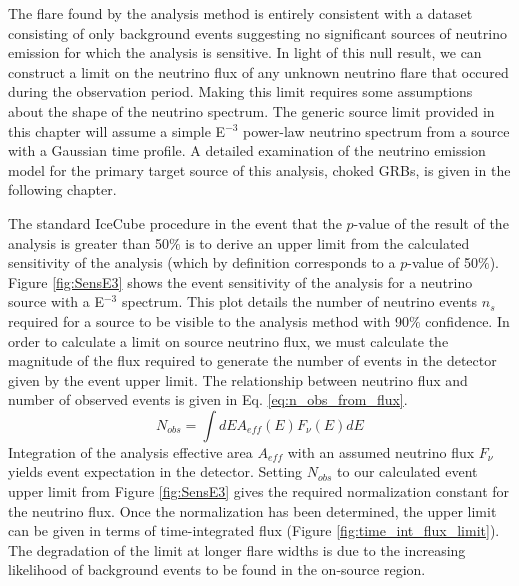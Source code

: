 \documentclass{gatech-thesis}
\begin{document}
The flare found by the analysis method is entirely consistent with a dataset consisting of only background events suggesting no significant sources of neutrino emission for which the analysis is sensitive. In light of this null result, we can construct a limit on the neutrino flux of any unknown neutrino flare that occured during the observation period. Making this limit requires some assumptions about the shape of the neutrino spectrum. The generic source limit provided in this chapter will assume a simple E$^{-3}$ power-law neutrino spectrum from a source with a Gaussian time profile. A detailed examination of the neutrino emission model for the primary target source of this analysis, choked GRBs, is given in the following chapter.

The standard IceCube procedure in the event that the $p$-value of the result of the analysis is greater than 50$\%$ is to derive an upper limit from the calculated sensitivity of the analysis (which by definition corresponds to a $p$-value of 50$\%$). Figure \ref{fig:SensE3} shows the event sensitivity of the analysis for a neutrino source with a E$^{-3}$ spectrum. This plot details the number of neutrino events $n_s$ required for a source to be visible to the analysis method with 90$\%$ confidence. In order to calculate a limit on source neutrino flux, we must calculate the magnitude of the flux required to generate the number of events in the detector given by the event upper limit. The relationship between neutrino flux and number of observed events is given in Eq. \ref{eq:n_obs_from_flux}.
\begin{equation}\label{eq:n_obs_from_flux}
N_{obs} = \int dEA_{eff}(E)F_{\nu}(E)dE
\end{equation}
Integration of the analysis effective area $A_{eff}$ with an assumed neutrino flux $F_{\nu}$ yields event expectation in the detector. Setting $N_{obs}$ to our calculated event upper limit from Figure \ref{fig:SensE3} gives the required normalization constant for the neutrino flux. Once the normalization has been determined, the upper limit can be given in terms of time-integrated flux (Figure \ref{fig:time_int_flux_limit}). The degradation of the limit at longer flare widths is due to the increasing likelihood of background events to be found in the on-source region.
\end{document}

